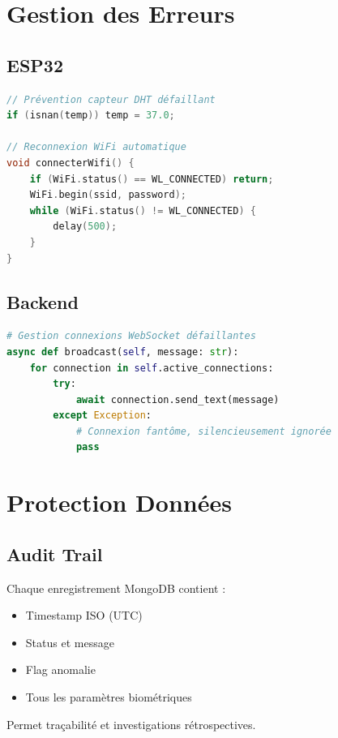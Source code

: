 \documentclass[12pt,french]{report}
\begin{document}
\section{Gestion des Erreurs}

\subsection{ESP32}

\begin{lstlisting}[language=C++]
// Prévention capteur DHT défaillant
if (isnan(temp)) temp = 37.0;

// Reconnexion WiFi automatique
void connecterWifi() {
    if (WiFi.status() == WL_CONNECTED) return;
    WiFi.begin(ssid, password);
    while (WiFi.status() != WL_CONNECTED) { 
        delay(500); 
    }
}
\end{lstlisting}

\subsection{Backend}

\begin{lstlisting}[language=Python]
# Gestion connexions WebSocket défaillantes
async def broadcast(self, message: str):
    for connection in self.active_connections:
        try:
            await connection.send_text(message)
        except Exception:
            # Connexion fantôme, silencieusement ignorée
            pass
\end{lstlisting}

\section{Protection Données}

\subsection{Audit Trail}

Chaque enregistrement MongoDB contient :
\begin{itemize}
    \item Timestamp ISO (UTC)
    \item Status et message
    \item Flag anomalie
    \item Tous les paramètres biométriques
\end{itemize}

Permet traçabilité et investigations rétrospectives.
\end{document}
